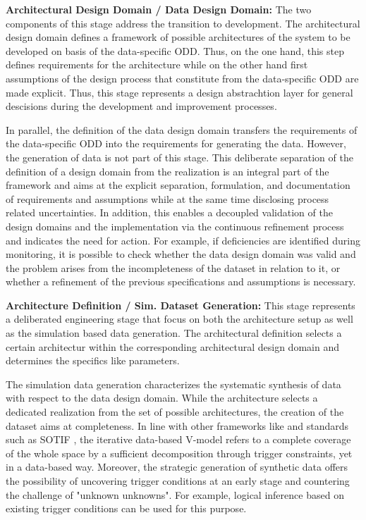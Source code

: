 \textbf{Architectural Design Domain / Data Design Domain:}  The two components of this stage address the transition to development. The architectural design domain defines a framework of possible architectures of the system to be developed on basis of the data-specific ODD. Thus, on the one hand, this step defines requirements for the architecture while on the other hand first assumptions of the design process that constitute from the data-specific ODD are made explicit. Thus, this stage represents a design abstrachtion layer for general descisions during the development and improvement processes.

In parallel, the definition of the data design domain transfers the requirements of the data-specific ODD into the requirements for
generating the data. However, the generation of data is not part of this stage. This deliberate separation of the definition of a design domain from the realization is an integral part of the framework and aims at the explicit separation, formulation, and documentation of requirements and assumptions while at the same time disclosing process related
uncertainties. In addition, this enables a decoupled validation of the design domains and the implementation via the continuous refinement process and indicates the need for action. For example, if deficiencies are identified during monitoring, it is possible to check whether the data design domain was valid and the problem arises from the incompleteness of the dataset in relation to it, or whether a refinement of the previous specifications and assumptions is necessary. 

\textbf{Architecture Definition / Sim. Dataset Generation:} This stage represents a deliberated engineering stage that focus on both the architecture setup as well as the simulation based data generation. The architectural definition selects a certain architectur within the corresponding architectural design domain and determines the specifics like parameters. 

The simulation data generation characterizes the systematic synthesis of data with respect to the data design domain. While the architecture selects a dedicated realization from the set of possible architectures, the creation of the dataset aims at completeness. In line with other frameworks like \cite{VVMOverall, favaro2023building, karpathy_cvpr21} and standards such as SOTIF \cite{iso21448}, the iterative data-based V-model refers to a complete coverage of the whole space by a sufficient decomposition through trigger constraints, yet in a data-based way. Moreover, the strategic generation of synthetic data offers the possibility of uncovering trigger conditions at an early stage and countering the challenge of "unknown unknowns". For example, logical inference based on existing trigger conditions can be used for this purpose.  

